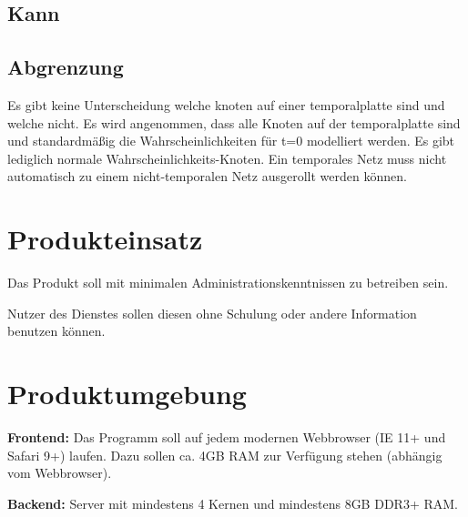 \documentclass[parskip=full,11pt,twoside]{scrartcl}
\begin{document}
\subsection{Kann}


\subsection{Abgrenzung}

Es gibt keine Unterscheidung welche \Gls{knoten} auf einer \Gls{temporalplatte} sind und welche nicht. Es wird angenommen, dass alle Knoten auf der \Gls{temporalplatte} sind und standardmäßig die Wahrscheinlichkeiten für t=0 modelliert werden.
Es gibt lediglich normale Wahrscheinlichkeits-Knoten.
Ein temporales Netz muss nicht automatisch zu einem nicht-temporalen Netz ausgerollt werden können.


\section{Produkteinsatz}

Das Produkt soll mit minimalen Administrationskenntnissen zu betreiben sein.

Nutzer des Dienstes sollen diesen ohne Schulung oder andere Information benutzen können.

\section{Produktumgebung}

\textbf{Frontend:} Das Programm soll auf jedem modernen Webbrowser (IE 11+ und Safari 9+) laufen. Dazu sollen ca. 4GB RAM zur Verfügung stehen (abhängig vom Webbrowser).

\textbf{Backend:} Server mit mindestens 4 Kernen und mindestens 8GB DDR3+ RAM.
\end{document}
